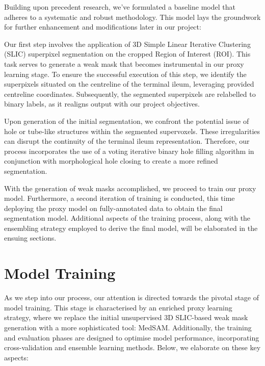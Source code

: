 Building upon precedent research, we've formulated a baseline model that adheres to a systematic and robust methodology. This model lays the groundwork for further enhancement and modifications later in our project:

Our first step involves the application of 3D Simple Linear Iterative Clustering (SLIC) superpixel segmentation on the cropped Region of Interest (ROI). This task serves to generate a weak mask that becomes instrumental in our proxy learning stage. To ensure the successful execution of this step, we identify the superpixels situated on the centreline of the terminal ileum, leveraging provided centreline coordinates. Subsequently, the segmented superpixels are relabelled to binary labels, as it realigns output with our project objectives.

Upon generation of the initial segmentation, we confront the potential issue of hole or tube-like structures within the segmented supervoxels. These irregularities can disrupt the continuity of the terminal ileum representation. Therefore, our process incorporates the use of a voting iterative binary hole filling algorithm in conjunction with morphological hole closing to create a more refined segmentation.

With the generation of weak masks accomplished, we proceed to train our proxy model. Furthermore, a second iteration of training is conducted, this time deploying the proxy model on fully-annotated data to obtain the final segmentation model. Additional aspects of the training process, along with the ensembling strategy employed to derive the final model, will be elaborated in the ensuing sections.

\section{Model Training}
As we step into our process, our attention is directed towards the pivotal stage of model training. This stage is characterised by an enriched proxy learning strategy, where we replace the initial unsupervised 3D SLIC-based weak mask generation with a more sophisticated tool: MedSAM. Additionally, the training and evaluation phases are designed to optimise model performance, incorporating cross-validation and ensemble learning methods. Below, we elaborate on these key aspects:

